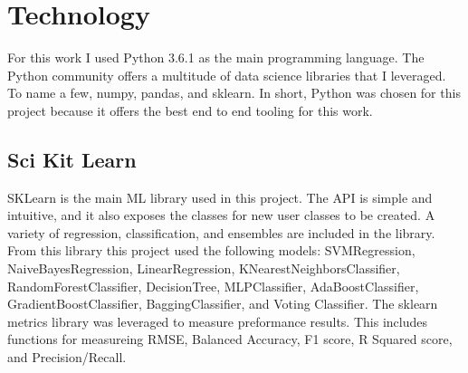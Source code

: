 \section{Technology}
\setlength{\parindent}{10ex}
For this work I used Python 3.6.1 as the main programming language.
The Python community offers a multitude of data science libraries that I leveraged.
To name a few, numpy, pandas, and sklearn.
In short, Python was chosen for this project because it offers the best end to end tooling for this work.

\subsection{Sci Kit Learn}
SKLearn is the main \ac{ML} library used in this project.
The \ac{API} is simple and intuitive, and it also exposes the classes for new user classes to be created.
A variety of regression, classification, and ensembles are included in the library.
From this library this project used the following models: SVMRegression, NaiveBayesRegression, LinearRegression, KNearestNeighborsClassifier, RandomForestClassifier, DecisionTree, MLPClassifier, AdaBoostClassifier, GradientBoostClassifier, BaggingClassifier, and Voting Classifier.
The sklearn metrics library was leveraged to measure preformance results.
This includes functions for measureing \ac{RMSE}, Balanced Accuracy, F1 score, R Squared score, and Precision/Recall.

